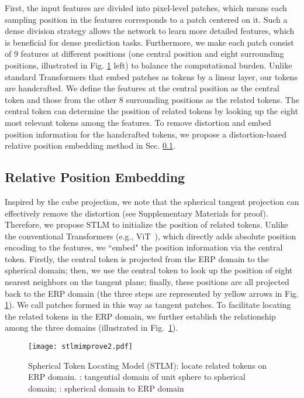 \documentclass[runningheads]{llncs}
\begin{document}
 First, the input features are divided into pixel-level patches, which means each sampling position in the features corresponds to a patch centered on it. Such a dense division strategy allows the network to learn more detailed features, which is beneficial for dense prediction tasks. Furthermore, we make each patch consist of 9 features at different positions (one central position and eight surrounding positions, illustrated in Fig. \ref{fig:STLM} left) to balance the computational burden. Unlike standard Transformers that embed patches as tokens by a linear layer, our tokens are handcrafted. We define the features at the central position as the central token and those from the other 8 surrounding positions as the related tokens. The central token can determine the position of related tokens by looking up the eight most relevant tokens among the features. To remove distortion and embed position information for the handcrafted tokens, we propose a distortion-based relative position embedding method in Sec. \ref{section32}. 
 
 \subsection{Relative Position Embedding}
 \label{section32}
 Inspired by the cube projection, we note that the spherical tangent projection can effectively remove the distortion (see Supplementary Materials for proof). Therefore, we propose STLM to initialize the position of related tokens. Unlike the conventional Transformers (e.g., ViT~\cite{dosovitskiy2020image}), which directly adds absolute position encoding to the features, we ``embed" the position information via the central token. Firstly, the central token is projected from the ERP domain to the spherical domain; then, we use the central token to look up the position of eight nearest neighbors on the tangent plane; finally, these positions are all projected back to the ERP domain (the three steps are represented by yellow arrows in Fig. \ref{fig:STLM}). We call patches formed in this way as tangent patches. To facilitate locating the related tokens in the ERP domain, we further establish the relationship among the three domains (illustrated in Fig.~\ref{fig:STLM}).
\begin{figure}[t]
  \centering
  \texttt{[image: stlmimprove2.pdf]} \caption{Spherical Token Locating Model (STLM): locate related tokens on ERP domain. : tangential domain of unit sphere to spherical domain; : spherical domain to ERP domain} \label{fig:STLM}
\end{figure}
\end{document}
